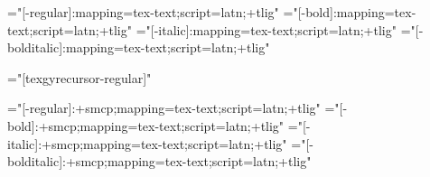 

\ifx\directlua\undefined \else \ifx\luafonts\undefined 
\fi\fi  %

\ifx\fontfeatures\undefined 
   \def\fontfeatures{mapping=tex-text;script=latn;+tlig} 
\fi

\font\tenrm="[\famname-regular]:\fontfeatures"    \sizespec
\font\tenbf="[\famname-bold]:\fontfeatures"       \sizespec
\font\tenit="[\famname-italic]:\fontfeatures"     \sizespec
\font\tenbi="[\famname-bolditalic]:\fontfeatures" \sizespec

\font\tentt="[texgyrecursor-regular]"     \sizespec

\font\tenrmc="[\famname-regular]:+smcp;\fontfeatures"    \sizespec       
\font\tenbfc="[\famname-bold]:+smcp;\fontfeatures"       \sizespec
\font\tenitc="[\famname-italic]:+smcp;\fontfeatures"     \sizespec
\font\tenbic="[\famname-bolditalic]:+smcp;\fontfeatures" \sizespec

\endinput
